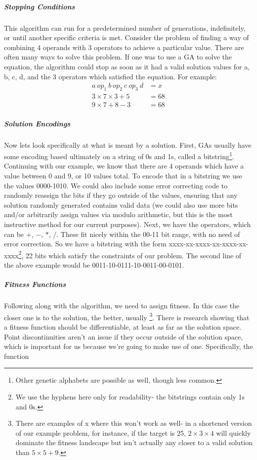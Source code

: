 \subparagraph{Stopping Conditions} This algorithm can run for a predetermined number of generations, indefinitely, or until another specific criteria is met.  Consider the problem of finding a way of combining 4 operands with 3 operators to achieve a particular value.  There are often many ways to solve this problem.  If one was to use a GA to solve the equation, the algorithm could stop as soon as it had a valid solution values for a, b, c, d, and the 3 operators which satisfied the equation.  For example:
\begin{align*}
		a \: op_1\: b\: op_2\: c\: op_3\: d &= x\\
		3 \times 7 \times 3 + 5 &= 68\\
		9 \times 7 + 8 - 3 &= 68
\end{align*}
\subparagraph{Solution Encodings}
Now lets look specifically at what is meant by a solution.  First, GAs usually have some encoding based ultimately on a string of 0s and 1s, called a bitstring\footnote{Other genetic alphabets are possible as well, though less common.}. Continuing with our example, we know that there are 4 operands which have a value between 0 and 9, or 10 values total.  To encode that in a bitstring we use the values 0000-1010.  We could also include some error correcting code to randomly reassign the bits if they go outside of the values, ensuring that any solution randomly generated contains valid data (we could also use more bits and/or arbitrarily assign values via modulo arithmetic, but this is the most instructive method for our current purposes).  Next, we have the operators, which can be $+$, $-$, $*$, $/$.  These fit nicely within the 00-11 bit range, with no need of error correction.  So we have a bitstring with the form xxxx-xx-xxxx-xx-xxxx-xx-xxxx\footnote{We use the hyphens here only for readability- the bitstrings contain only 1s and 0s.}, 22 bits which satisfy the constraints of our problem. The second line of the above example would be 0011-10-0111-10-0011-00-0101.
\subparagraph{Fitness Functions}
Following along with the algorithm, we need to assign fitness.  In this case the closer one is to the solution, the better, usually \footnote{There are examples of x where this won't work as well- in a shortened version of our example problem, for instance, if the target is 25, $2\times3\times4$ will quickly dominate the fitness landscape but isn't actually any closer to a valid solution than $5\times5+9$.}.  There is research showing that a fitness function should be differentiable, at least as far as the solution space.  Point discontinuities aren't an issue if they occur outside of the solution space, which is important for us because we're going to make use of one. Specifically, the function 
